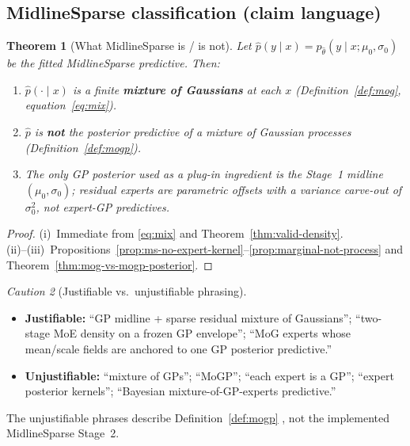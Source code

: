 \documentclass[11pt,a4paper]{article}
\theoremstyle{plain}
\newtheorem{theorem}{Theorem}[section]
\theoremstyle{definition}
\theoremstyle{remark}
\newtheorem{caution}[theorem]{Caution}
\newcommand{\tht}{\theta}
\begin{document}
\subsection{MidlineSparse classification (claim language)}
\begin{theorem}[What MidlineSparse is / is not]
\label{thm:ms-classification}
Let \(\hat p(y\mid x)=p_{\hat\tht}(y\mid x;\mu_0,\sigma_0)\) be the fitted MidlineSparse
predictive. Then:
\begin{enumerate}[label=(\roman*)]
  \item \(\hat p(\cdot\mid x)\) is a finite \textbf{mixture of Gaussians} at each \(x\)
        (Definition~\ref{def:mog}, equation~\eqref{eq:mix}).
  \item \(\hat p\) is \textbf{not} the posterior predictive of a mixture of Gaussian
        processes (Definition~\ref{def:mogp}).
  \item The only GP posterior used as a plug-in ingredient is the Stage~1 midline
        \((\mu_0,\sigma_0)\); residual experts are parametric offsets with a variance
        carve-out of \(\sigma_0^2\), not expert-GP predictives.
\end{enumerate}
\end{theorem}

\begin{proof}
(i)~Immediate from \eqref{eq:mix} and Theorem~\ref{thm:valid-density}.\\
(ii)--(iii)~Propositions~\ref{prop:ms-no-expert-kernel}--\ref{prop:marginal-not-process}
and Theorem~\ref{thm:mog-vs-mogp-posterior}.
\end{proof}

\begin{caution}[Justifiable vs.\ unjustifiable phrasing]
\begin{itemize}[leftmargin=1.2em]
  \item \textbf{Justifiable:} ``GP midline + sparse residual mixture of Gaussians'';
        ``two-stage MoE density on a frozen GP envelope''; ``MoG experts whose mean/scale
        fields are anchored to one GP posterior predictive.''
  \item \textbf{Unjustifiable:} ``mixture of GPs''; ``MoGP''; ``each expert is a GP'';
        ``expert posterior kernels''; ``Bayesian mixture-of-GP-experts predictive.''
\end{itemize}
The unjustifiable phrases describe Definition~\ref{def:mogp}
\citep{Tresp2001,RasmussenGhahramani2001}, not the implemented MidlineSparse Stage~2.
\end{caution}
\end{document}
